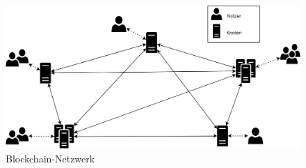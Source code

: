     \begin{figure}[H]
    	\centering
    	\includegraphics[width=\textwidth]{graphics/BCNetwork.png}
    	\caption[Blockchain-Netzwerk]{Blockchain-Netzwerk}
    	\label{fig:bc_network}
    \end{figure}
    
